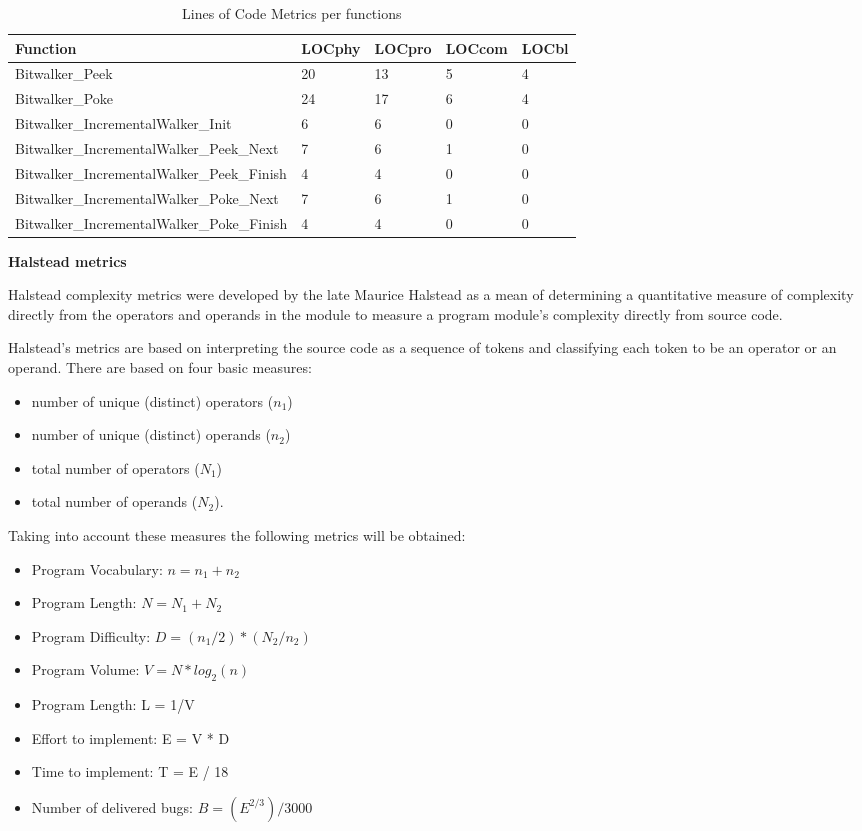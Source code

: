 \begin{description}
\begin{longtable}{||p{}|p{}|p{}|p{}|p{}||}
  \caption{Lines of Code Metrics per functions}\\
    \hline\hline
    \textbf{Function} &\textbf{LOCphy} & \textbf{LOCpro} & \textbf{LOCcom} & \textbf{LOCbl}\\
    \hline\hline
    \endhead
    \hline\hline
    \endfoot
    Bitwalker\_Peek & 20 & 13 & 5 & 4
    \\
    \hline
    Bitwalker\_Poke & 24 & 17 & 6 & 4
    \\
    \hline
    Bitwalker\_IncrementalWalker\_Init & 6 & 6 & 0 & 0
    \\
    \hline
    Bitwalker\_IncrementalWalker\_Peek\_Next & 7 & 6 & 1 & 0
    \\
    \hline
    Bitwalker\_IncrementalWalker\_Peek\_Finish & 4 & 4 & 0 & 0
    \\
    \hline
    Bitwalker\_IncrementalWalker\_Poke\_Next & 7 & 6 & 1 & 0
    \\
    \hline
    Bitwalker\_IncrementalWalker\_Poke\_Finish & 4 & 4 & 0 & 0
    \\
    \hline
   \end{longtable}

\item \textbf{Halstead metrics}

Halstead complexity metrics were developed by the late Maurice Halstead as a mean of determining a quantitative measure of complexity directly from the operators and operands in the module to measure a program module's complexity directly from source code.

Halstead's metrics are based on interpreting the source code as a sequence of tokens and classifying each token to be an operator or an operand. There are based on four basic measures:
\begin{itemize}
\item number of unique (distinct) operators ($n_1$)
\item number of unique (distinct) operands ($n_2$)
\item total number of operators ($N_1$)
\item total number of operands ($N_2$).
\end{itemize}

Taking into account these measures the following metrics will be obtained:
\begin{itemize}
\item Program Vocabulary: $n = n_1 + n_2$
\item Program Length: $N = N_1 + N_2$
\item Program Difficulty: $D = ( n_1 / 2 ) * ( N_2 / n_2 )$
\item Program Volume: $V = N * log_2 (n)$
\item Program Length: L = 1/V
\item Effort to implement: E = V * D
\item Time to implement: T = E / 18
\item Number of delivered bugs: $B = (E^{2/3}) / 3000$
\end{itemize}


\end{description}
